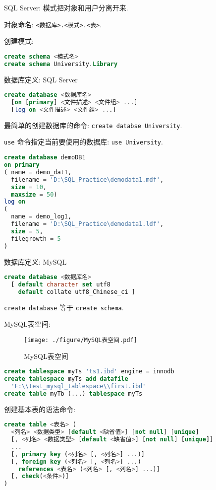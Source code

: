 SQL Server: 模式把对象和用户分离开来.

对象命名: \verb|<数据库>.<模式>.<表>|.

创建模式:
\begin{lstlisting}[language=SQL]
create schema <模式名>
create schema University.Library
\end{lstlisting}

数据库定义: SQL Server
\begin{lstlisting}[language=SQL]
create database <数据库名>
  [on [primary] <文件描述> <文件组> ...]
  [log on <文件描述> <文件组> ...]
\end{lstlisting}

最简单的创建数据库的命令: \verb|create databse University|.

\verb|use| 命令指定当前要使用的数据库: \verb|use University|.

\begin{lstlisting}[language=SQL]
create database demoDB1
on primary
( name = demo_dat1,
  filename = 'D:\SQL_Practice\demodata1.mdf',
  size = 10,
  maxsize = 50)
log on
(
  name = demo_log1,
  filename = 'D:\SQL_Practice\demodata1.ldf',
  size = 5,
  filegrowth = 5
)
\end{lstlisting}

数据库定义: MySQL
\begin{lstlisting}[language=SQL]
create database <数据库名>
  [ default character set utf8
    default collate utf8_Chinese_ci ]
\end{lstlisting}

\verb|create database| 等于 \verb|create schema|.

MySQL表空间:

\begin{figure}[H]
    \centering
    \texttt{[image: ./figure/MySQL表空间.pdf]}
    \caption{MySQL表空间}
\end{figure}

\begin{lstlisting}[language=SQL]
create tablespace myTs 'ts1.ibd' engine = innodb
create tablespace myTs add datafile
  'F:\\test_mysql_tablespace\\first.ibd'
create table myTb (...) tablespace myTs
\end{lstlisting}

创建基本表的语法命令:
\begin{lstlisting}[language=SQL]
create table <表名> (
  <列名> <数据类型> [default <缺省值>] [not null] [unique]
  [, <列名> <数据类型> [default <缺省值>] [not null] [unique]]
  ...
  [, primary key (<列名> [, <列名>] ...)]
  [, foreign key (<列名> [, <列名>] ...)
    references <表名> (<列名> [, <列名>] ...)]
  [, check(<条件>)]
)
\end{lstlisting}

